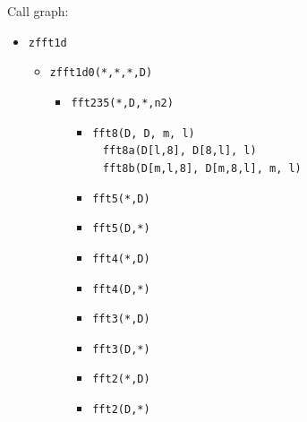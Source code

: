 \documentclass[twocolumn]{article}
\begin{document}
Call graph:
\begin{itemize}
\item \texttt{zfft1d}
  \begin{itemize}
  \item \texttt{zfft1d0(*,*,*,D)}
    \begin{itemize}
    \item \texttt{fft235(*,D,*,n2)}
      \begin{itemize}
      \item \texttt{fft8(D, D, m, l)} \\
        \textbullet\mbox{ } \texttt{fft8a(D[l,8], D[8,l], l)} \\
        \textbullet\mbox{ } \texttt{fft8b(D[m,l,8], D[m,8,l], m, l)}
      \item \texttt{fft5(*,D)}
      \item \texttt{fft5(D,*)}
      \item \texttt{fft4(*,D)}
      \item \texttt{fft4(D,*)}
      \item \texttt{fft3(*,D)}
      \item \texttt{fft3(D,*)}
      \item \texttt{fft2(*,D)}
      \item \texttt{fft2(D,*)}
      \end{itemize}
    \end{itemize}
  \end{itemize}
\end{itemize}
\end{document}
